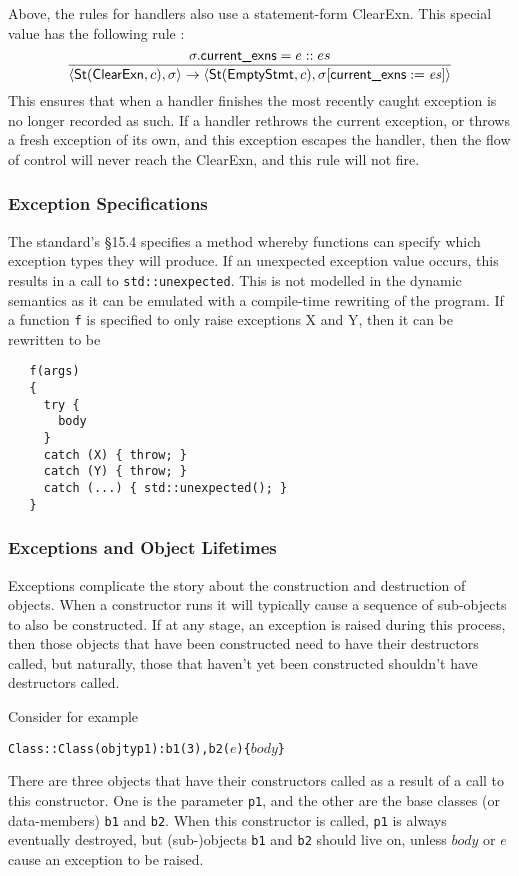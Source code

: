 \documentclass[11pt]{article}
\begin{document}
Above, the rules for handlers also use a statement-form
\textsf{ClearExn}.  This special value has the following rule
:
\[
\infer{
\statebrack{\textsf{St}(\textsf{ClearExn},c), \sigma}
\to
\statebrack{\textsf{St}(\textsf{EmptyStmt},c),
  \sigma[\textsf{current\_exns}:=\mathit{es}]}
}{
  \sigma.\textsf{current\_exns} = e::es
}
\]
This ensures that when a handler finishes the most recently caught
exception is no longer recorded as such.  If a handler rethrows the
current exception, or throws a fresh exception of its own, and this
exception escapes the handler, then the flow of control will never
reach the \textsf{ClearExn}, and this rule will not fire.

\subsubsection{Exception Specifications}

The standard's \S15.4 specifies a method whereby functions can specify
which exception types they will produce.  If an unexpected exception
value occurs, this results in a call to \texttt{std::unexpected}.
This is not modelled in the dynamic semantics as it can be emulated
with a compile-time rewriting of the program.  If a function
\texttt{f} is specified to only raise exceptions X and Y, then it can
be rewritten to be
\begin{verbatim}
   f(args)
   {
     try {
       body
     }
     catch (X) { throw; }
     catch (Y) { throw; }
     catch (...) { std::unexpected(); }
   }
\end{verbatim}

\subsubsection{Exceptions and Object Lifetimes}

Exceptions complicate the story about the construction and destruction
of objects.  When a constructor runs it will typically cause a
sequence of sub-objects to also be constructed. If at any stage, an
exception is raised during this process, then those objects that have
been constructed need to have their destructors called, but naturally,
those that haven't yet been constructed shouldn't have destructors
called.

Consider for example
\begin{alltt}
  Class::Class(objty p1) : b1(3), b2(\(e\)) \{ \(\mathit{body}\) \}
\end{alltt}
There are three objects that have their constructors called as a
result of a call to this constructor.  One is the parameter
\texttt{p1}, and the other are the base classes (or data-members)
\texttt{b1} and \texttt{b2}.  When this constructor is called,
\texttt{p1} is always eventually destroyed, but (sub-)objects
\texttt{b1} and \texttt{b2} should live on, unless $\mathit{body}$ or
$e$ cause an exception to be raised.
\end{document}
